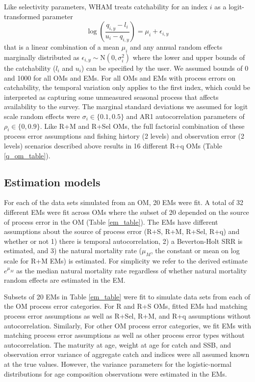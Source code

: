 \documentclass[
  12pt,
]{article}
\begin{document}
Like selectivity parameters, WHAM treats catchability for an index \(i\)
as a logit-transformed parameter \[
\log\left(\frac{q_{i,y}-l_{i}}{u_{i}-q_{i,y}}\right) = \mu_i + \epsilon_{i,y}
\] that is a linear combination of a mean \(\mu_i\) and any annual
random effects marginally distributed as
\(\epsilon_{i,y} \sim \text{N}\left(0,\sigma_i^2\right)\) where the
lower and upper bounds of the catchability (\(l_i\) and \(u_i\)) can be
specified by the user. We assumed bounds of 0 and 1000 for all OMs and
EMs. For all OMs and EMs with process errors on catchability, the
temporal variation only applies to the first index, which could be
interpreted as capturing some unmeasured seasonal process that affects
availability to the survey. The marginal standard deviations we assumed
for logit scale random effects were \(\sigma_i \in \{0.1, 0.5\}\) and
AR1 autocorrelation parameters of \(\rho_i \in \{0,0.9\}\). Like R+M and
R+Sel OMs, the full factorial combination of these process error
assumptions and fishing history (2 levels) and observation error (2
levels) scenarios described above results in 16 different R+q OMs (Table
\ref{q_om_table}).

\hypertarget{estimation-models}{%
\subsection*{Estimation models}\label{estimation-models}}

For each of the data sets simulated from an OM, 20 EMs were fit. A total
of 32 different EMs were fit across OMs where the subset of 20 depended
on the source of process error in the OM (Table \ref{em_table}). The EMs
have different assumptions about the source of process error (R+S, R+M,
R+Sel, R+q) and whether or not 1) there is temporal autocorrelation, 2)
a Beverton-Holt SRR is estimated, and 3) the natural mortality rate
(\(\mu_M\), the constant or mean on log scale for R+M EMs) is estimated.
For simplicity we refer to the derived estimate \(e^{\mu_M}\) as the
median natural mortality rate regardless of whether natural mortality
random effects are estimated in the EM.

Subsets of 20 EMs in Table \ref{em_table} were fit to simulate data sets
from each of the OM process error categories. For R and R+S OMs, fitted
EMs had matching process error assumptions as well as R+Sel, R+M, and
R+q assumptions without autocorrelation. Similarly, For other OM process
error categories, we fit EMs with matching process error assumptions as
well as other process error types without autocorrelation. The maturity
at age, weight at age for catch and SSB, and observation error variance
of aggregate catch and indices were all assumed known at the true
values. However, the variance parameters for the logistic-normal
distributions for age composition observations were estimated in the
EMs.
\end{document}
